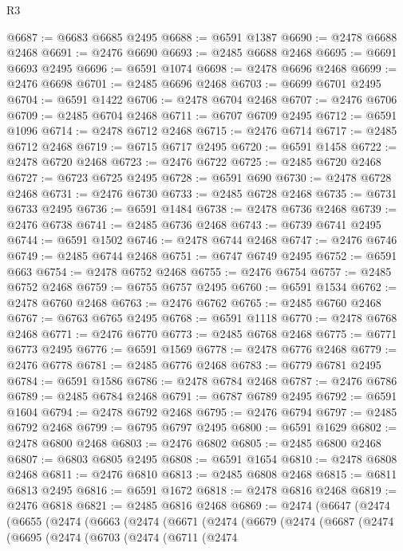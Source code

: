 \begin{lexlean}{R3}
\begin{coremodule}
@6687 := @6683 @6685 @2495
@6688 := @6591 @1387
@6690 := @2478 @6688 @2468
@6691 := @2476 @6690
@6693 := @2485 @6688 @2468
@6695 := @6691 @6693 @2495
@6696 := @6591 @1074
@6698 := @2478 @6696 @2468
@6699 := @2476 @6698
@6701 := @2485 @6696 @2468
@6703 := @6699 @6701 @2495
@6704 := @6591 @1422
@6706 := @2478 @6704 @2468
@6707 := @2476 @6706
@6709 := @2485 @6704 @2468
@6711 := @6707 @6709 @2495
@6712 := @6591 @1096
@6714 := @2478 @6712 @2468
@6715 := @2476 @6714
@6717 := @2485 @6712 @2468
@6719 := @6715 @6717 @2495
@6720 := @6591 @1458
@6722 := @2478 @6720 @2468
@6723 := @2476 @6722
@6725 := @2485 @6720 @2468
@6727 := @6723 @6725 @2495
@6728 := @6591 @690
@6730 := @2478 @6728 @2468
@6731 := @2476 @6730
@6733 := @2485 @6728 @2468
@6735 := @6731 @6733 @2495
@6736 := @6591 @1484
@6738 := @2478 @6736 @2468
@6739 := @2476 @6738
@6741 := @2485 @6736 @2468
@6743 := @6739 @6741 @2495
@6744 := @6591 @1502
@6746 := @2478 @6744 @2468
@6747 := @2476 @6746
@6749 := @2485 @6744 @2468
@6751 := @6747 @6749 @2495
@6752 := @6591 @663
@6754 := @2478 @6752 @2468
@6755 := @2476 @6754
@6757 := @2485 @6752 @2468
@6759 := @6755 @6757 @2495
@6760 := @6591 @1534
@6762 := @2478 @6760 @2468
@6763 := @2476 @6762
@6765 := @2485 @6760 @2468
@6767 := @6763 @6765 @2495
@6768 := @6591 @1118
@6770 := @2478 @6768 @2468
@6771 := @2476 @6770
@6773 := @2485 @6768 @2468
@6775 := @6771 @6773 @2495
@6776 := @6591 @1569
@6778 := @2478 @6776 @2468
@6779 := @2476 @6778
@6781 := @2485 @6776 @2468
@6783 := @6779 @6781 @2495
@6784 := @6591 @1586
@6786 := @2478 @6784 @2468
@6787 := @2476 @6786
@6789 := @2485 @6784 @2468
@6791 := @6787 @6789 @2495
@6792 := @6591 @1604
@6794 := @2478 @6792 @2468
@6795 := @2476 @6794
@6797 := @2485 @6792 @2468
@6799 := @6795 @6797 @2495
@6800 := @6591 @1629
@6802 := @2478 @6800 @2468
@6803 := @2476 @6802
@6805 := @2485 @6800 @2468
@6807 := @6803 @6805 @2495
@6808 := @6591 @1654
@6810 := @2478 @6808 @2468
@6811 := @2476 @6810
@6813 := @2485 @6808 @2468
@6815 := @6811 @6813 @2495
@6816 := @6591 @1672
@6818 := @2478 @6816 @2468
@6819 := @2476 @6818
@6821 := @2485 @6816 @2468
@6869 := @2474
    (@6647
      (@2474
        (@6655
          (@2474
            (@6663
              (@2474
                (@6671
                  (@2474
                    (@6679
                      (@2474
                        (@6687
                          (@2474
                            (@6695
                              (@2474
                                (@6703
                                  (@2474
                                    (@6711
                                      (@2474

\end{coremodule}
\end{lexlean}
